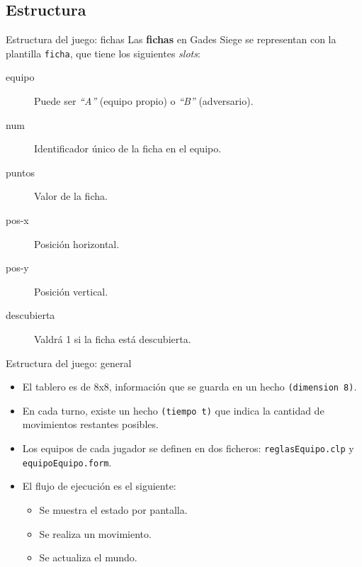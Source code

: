 \documentclass[smaller,spanish,xcolor=svgnames]{beamer}
\begin{document}
\subsection{Estructura}

\begin{frame}[fragile]{Estructura del juego: fichas}
  Las \textbf{fichas} en Gades Siege se representan con la plantilla \texttt{ficha}, que
  tiene los siguientes \textit{slots}:
  \begin{description}
  \item[equipo] Puede ser \textit{``A''} (equipo propio) o \textit{``B''} (adversario).
  \item[num] Identificador único de la ficha en el equipo.
  \item[puntos] Valor de la ficha.
  \item[pos-x] Posición horizontal.
  \item[pos-y] Posición vertical.
  \item[descubierta] Valdrá 1 si la ficha está descubierta.
  \end{description}  
\end{frame}


\begin{frame}{Estructura del juego: general}
  \begin{itemize}
  \item El tablero es de 8x8, información que se guarda en un hecho \texttt{(dimension 8)}.
  \item En cada turno, existe un hecho \texttt{(tiempo t)} que indica la
    cantidad de movimientos restantes posibles.
  \item Los equipos de cada jugador se definen en dos ficheros: \texttt{reglasEquipo.clp} y \texttt{equipoEquipo.form}.
  \item El flujo de ejecución es el siguiente:
    \begin{itemize}
    \item Se muestra el estado por pantalla.
    \item Se realiza un movimiento.
    \item Se actualiza el mundo.
    \end{itemize}
  \end{itemize}  
\end{frame}
\end{document}
